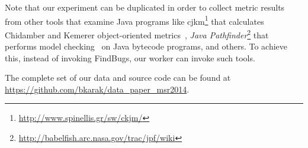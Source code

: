 \documentclass{sig-alternate}
\begin{document}
Note that our experiment can be duplicated
in order to collect metric results from other tools that
examine Java programs like
{\sc cjkm}\footnote{\url{http://www.spinellis.gr/sw/ckjm/}}
that calculates Chidamber and Kemerer
object-oriented metrics~\cite{CK91},
{\it Java Pathfinder}\footnote{\url{http://babelfish.arc.nasa.gov/trac/jpf/wiki}}
that performs
model checking~\cite{CEES09} on Java bytecode programs,
and others. To achieve this, instead of invoking
FindBugs, our worker can invoke such tools.

The complete set of our data and source code
can be found at
\url{https://github.com/bkarak/data_paper_msr2014}.


  
\end{document}
